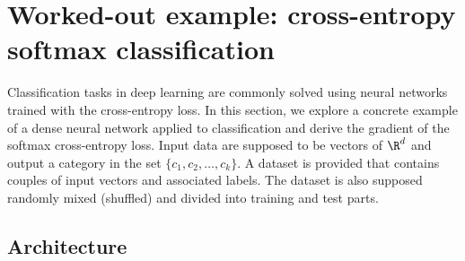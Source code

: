 \section{Worked-out example: cross-entropy softmax classification}

Classification tasks in deep learning are commonly solved using neural networks trained with the cross-entropy loss. In this section, we explore a concrete example of a dense neural network applied to classification and derive the gradient of the softmax cross-entropy loss. Input data are supposed to be vectors of $\R^d$ and output a category in the set $\{c_1, c_2, \ldots, c_k\}$. A dataset is provided that contains couples of input vectors and associated labels. The dataset is also supposed randomly mixed (shuffled) and divided into training and test parts.

\subsection{Architecture}

